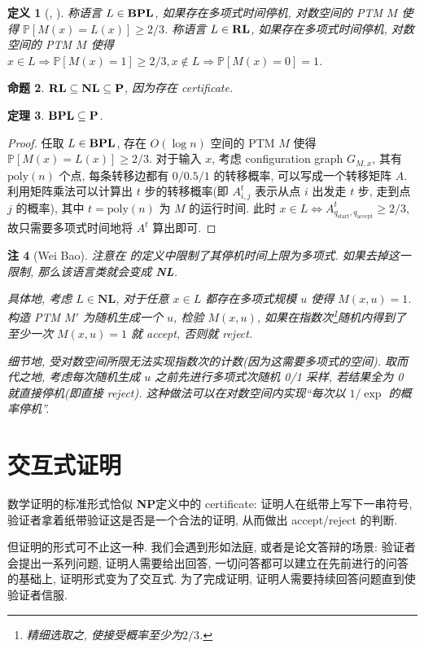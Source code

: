 \documentclass[8pt]{article}
\theoremstyle{compact}
\newtheorem{theorem}{定理}[section]
\newtheorem{definition}[theorem]{定义}
\newtheorem{proposition}[theorem]{命题}
\newtheorem{remark}[theorem]{注}
\def\ge{\geqslant}
\def\P{\textbf{P}}
\def\NP{\textbf{NP}}
\def\NL{\textbf{NL}}
\begin{document}
\begin{definition}[\BPL, \RL]
	称语言 $L \in \textbf{BPL}$, 如果存在多项式时间停机, 对数空间的 PTM $M$ 使得 $\mathbb P[M(x) = L(x)] \ge 2/3$. 称语言 $L \in \textbf{RL}$, 如果存在多项式时间停机, 对数空间的 PTM $M$ 使得 $x \in L \Rightarrow \mathbb P[M(x)=1] \ge 2/3, x \notin L \Rightarrow \mathbb P[M(x) = 0] = 1$.
\end{definition}
\begin{proposition}
	$\RL \subseteq \NL \subseteq \P$, 因为存在 certificate.
\end{proposition}
\begin{theorem}
	$\BPL \subseteq \P$.
\end{theorem}
\begin{proof}
	任取 $L \in \textbf{BPL}$, 存在 $O(\log n)$ 空间的 PTM $M$ 使得 $\mathbb P[M(x) = L(x)] \ge 2/3$. 对于输入 $x$, 考虑 configuration graph $G_{M, x}$, 其有 $\text{poly}(n)$ 个点, 每条转移边都有 $0/0.5/1$ 的转移概率, 可以写成一个转移矩阵 $A$. 利用矩阵乘法可以计算出 $t$ 步的转移概率(即 $A^t_{i, j}$ 表示从点 $i$ 出发走 $t$ 步, 走到点 $j$ 的概率), 其中 $t = \text{poly}(n)$ 为 $M$ 的运行时间. 此时 $x \in L \Leftrightarrow A^t_{q_{\text{start}}, q_{\text{accept}}} \ge 2/3$, 故只需要多项式时间地将 $A^t$ 算出即可.
\end{proof}
\begin{remark}[Wei Bao]
	注意在 \RL 的定义中限制了其停机时间上限为多项式. 如果去掉这一限制, 那么该语言类就会变成 \NL.

	具体地, 考虑 $L \in \NL$, 对于任意 $x \in L$ 都存在多项式规模 $u$ 使得 $M(x, u) = 1$. 构造 PTM $M'$ 为随机生成一个 $u$, 检验 $M(x, u)$, 如果在指数次\footnote{精细选取之, 使接受概率至少为$2/3$.}随机内得到了至少一次 $M(x, u) = 1$ 就 accept, 否则就 reject. 

	细节地, 受对数空间所限无法实现指数次的计数(因为这需要多项式的空间). 取而代之地, 考虑每次随机生成 $u$ 之前先进行多项式次随机 0/1 采样, 若结果全为 0 就直接停机(即直接 reject). 这种做法可以在对数空间内实现“每次以 $1 / \exp$ 的概率停机”.


\end{remark}

\newpage
\section{交互式证明}
数学证明的标准形式恰似 \NP 定义中的 certificate: 证明人在纸带上写下一串符号, 验证者拿着纸带验证这是否是一个合法的证明, 从而做出 accept/reject 的判断.

但证明的形式可不止这一种. 我们会遇到形如法庭, 或者是论文答辩的场景: 验证者会提出一系列问题, 证明人需要给出回答, 一切问答都可以建立在先前进行的问答的基础上, 证明形式变为了交互式. 为了完成证明, 证明人需要持续回答问题直到使验证者信服.
\end{document}
